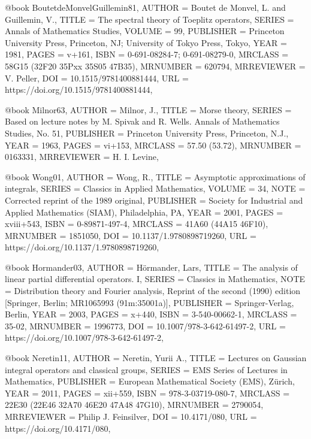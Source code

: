 @book {BoutetdeMonvelGuillemin81,
    AUTHOR = {Boutet de Monvel, L. and Guillemin, V.},
     TITLE = {The spectral theory of {T}oeplitz operators},
    SERIES = {Annals of Mathematics Studies},
    VOLUME = {99},
 PUBLISHER = {Princeton University Press, Princeton, NJ; University of Tokyo
              Press, Tokyo},
      YEAR = {1981},
     PAGES = {v+161},
      ISBN = {0-691-08284-7; 0-691-08279-0},
   MRCLASS = {58G15 (32F20 35Pxx 35S05 47B35)},
  MRNUMBER = {620794},
MRREVIEWER = {V. Peller},
       DOI = {10.1515/9781400881444},
       URL = {https://doi.org/10.1515/9781400881444},
}

@book {Milnor63,
    AUTHOR = {Milnor, J.},
     TITLE = {Morse theory},
    SERIES = {Based on lecture notes by M. Spivak and R. Wells. Annals of
              Mathematics Studies, No. 51},
 PUBLISHER = {Princeton University Press, Princeton, N.J.},
      YEAR = {1963},
     PAGES = {vi+153},
   MRCLASS = {57.50 (53.72)},
  MRNUMBER = {0163331},
MRREVIEWER = {H. I. Levine},
}

@book {Wong01,
    AUTHOR = {Wong, R.},
     TITLE = {Asymptotic approximations of integrals},
    SERIES = {Classics in Applied Mathematics},
    VOLUME = {34},
      NOTE = {Corrected reprint of the 1989 original},
 PUBLISHER = {Society for Industrial and Applied Mathematics (SIAM),
              Philadelphia, PA},
      YEAR = {2001},
     PAGES = {xviii+543},
      ISBN = {0-89871-497-4},
   MRCLASS = {41A60 (44A15 46F10)},
  MRNUMBER = {1851050},
       DOI = {10.1137/1.9780898719260},
       URL = {https://doi.org/10.1137/1.9780898719260},
}

@book {Hormander03,
    AUTHOR = {H\"{o}rmander, Lars},
     TITLE = {The analysis of linear partial differential operators. {I}},
    SERIES = {Classics in Mathematics},
      NOTE = {Distribution theory and Fourier analysis,
              Reprint of the second (1990) edition [Springer, Berlin;
              MR1065993 (91m:35001a)]},
 PUBLISHER = {Springer-Verlag, Berlin},
      YEAR = {2003},
     PAGES = {x+440},
      ISBN = {3-540-00662-1},
   MRCLASS = {35-02},
  MRNUMBER = {1996773},
       DOI = {10.1007/978-3-642-61497-2},
       URL = {https://doi.org/10.1007/978-3-642-61497-2},
}

@book {Neretin11,
    AUTHOR = {Neretin, Yurii A.},
     TITLE = {Lectures on {G}aussian integral operators and classical
              groups},
    SERIES = {EMS Series of Lectures in Mathematics},
 PUBLISHER = {European Mathematical Society (EMS), Z\"{u}rich},
      YEAR = {2011},
     PAGES = {xii+559},
      ISBN = {978-3-03719-080-7},
   MRCLASS = {22E30 (22E46 32A70 46E20 47A48 47G10)},
  MRNUMBER = {2790054},
MRREVIEWER = {Philip J. Feinsilver},
       DOI = {10.4171/080},
       URL = {https://doi.org/10.4171/080},
}

